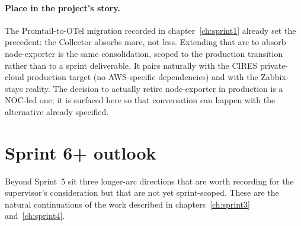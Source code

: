 \documentclass[11pt,a4paper,oneside]{report}
\begin{document}
\paragraph{Place in the project's story.}
The Promtail-to-OTel migration recorded in
chapter~\ref{ch:sprint1} already set the precedent: the Collector
absorbs more, not less. Extending that arc to absorb
node-exporter is the same consolidation, scoped to the production
transition rather than to a sprint deliverable. It pairs
naturally with the CIRES private-cloud production target (no
AWS-specific dependencies) and with the Zabbix-stays reality.
The decision to actually retire node-exporter in production is a
NOC-led one; it is surfaced here so that conversation can happen
with the alternative already specified.

\section{Sprint 6+ outlook}

Beyond Sprint~5 sit three longer-arc directions that are worth
recording for the supervisor's consideration but that are not
yet sprint-scoped.  These are the natural continuations of the
work described in chapters~\ref{ch:sprint3} and~\ref{ch:sprint4}.
\end{document}
